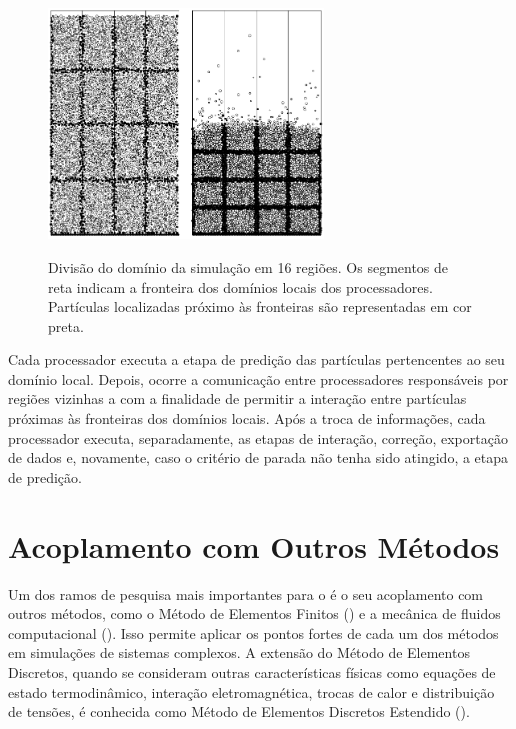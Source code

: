 \begin{figure}[h]
	\caption{Divisão do domínio da simulação em 16 regiões. Os segmentos de reta indicam a fronteira dos domínios locais dos processadores. Partículas localizadas próximo às fronteiras são representadas em cor preta.}
	\centering
		\includegraphics[width=0.65\textwidth]{images/discrete_element_method/parallelization/domain_division}
	\label{fig:discrete_element_method:parallelization}
\end{figure}

Cada processador executa a etapa de predição das partículas pertencentes ao seu domínio local. Depois, ocorre a comunicação entre processadores responsáveis por regiões vizinhas a com a finalidade de permitir a interação entre partículas próximas às fronteiras dos domínios locais. Após a troca de informações, cada processador executa, separadamente, as etapas de interação, correção, exportação de dados e, novamente, caso o critério de parada não tenha sido atingido, a etapa de predição.

\section{Acoplamento com Outros Métodos} \label{sec:discrete_element_method:coupling_with_other_methods}

Um dos ramos de pesquisa mais importantes para o \DEM{} é o seu acoplamento com outros métodos, como o Método de Elementos Finitos (\FEM{}) e a mecânica de fluidos computacional (\CFD{}). Isso permite aplicar os pontos fortes de cada um dos métodos em simulações de sistemas complexos. A extensão do Método de Elementos Discretos, quando se consideram outras características físicas como equações de estado termodinâmico, interação eletromagnética, trocas de calor e distribuição de tensões, é conhecida como Método de Elementos Discretos Estendido (\XDEM{}).

